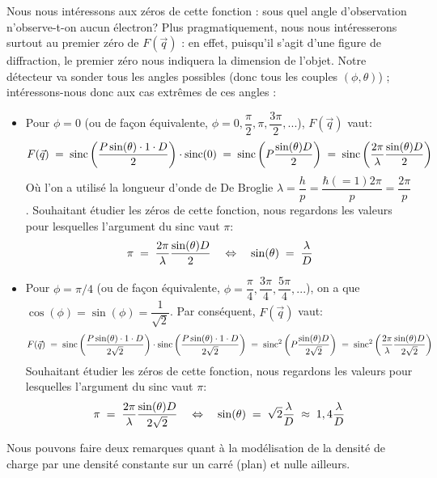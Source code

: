 Nous nous intéressons aux zéros de cette fonction : sous quel angle d'observation n'observe-t-on aucun électron? Plus pragmatiquement, nous nous intéresserons surtout au premier zéro de $F(\vec{q})$ : en effet, puisqu'il s'agit d'une figure de diffraction, le premier zéro nous indiquera la dimension de l'objet. Notre détecteur va sonder tous les angles possibles (donc tous les couples $(\phi,\theta)$) ; intéressons-nous donc aux cas extrêmes de ces angles : 
\begin{itemize}
    
    \item Pour $\phi=0$ (ou de façon équivalente, $\phi=0,\dfrac{\pi}{2},\pi,\dfrac{3\pi}{2},...$), $F(\vec{q})$ vaut:
    \[
        F(\vec{q})  \; = \; \operatorname{sinc}\left(\dfrac{P \sin(\theta)\cdot 1 \cdot D}{2}\right)\cdot \operatorname{sinc}(0) 
        \; = \; \operatorname{sinc}\left(P\dfrac{\sin(\theta)D}{2}\right)
        \; = \; \operatorname{sinc}\left(\dfrac{2\pi}{\lambda}\dfrac{\sin(\theta)D}{2}\right)
    \]
    Où l'on a utilisé la longueur d'onde de De Broglie $\lambda = \dfrac{h}{p} = \dfrac{\hbar(=1) 2\pi}{p} = \dfrac{2\pi}{p}$. Souhaitant étudier les zéros de cette fonction, nous regardons les valeurs pour lesquelles l'argument du sinc vaut $\pi$:
    \[
        \pi 
        \; = \; \dfrac{2\pi}{\lambda}\dfrac{\sin(\theta)D}{2}
        \quad \Leftrightarrow \quad
        \sin(\theta) \; = \; \dfrac{\lambda}{D}
    \]
    
    \item Pour $\phi=\pi/4$ (ou de façon équivalente, $\phi=\dfrac{\pi}{4},\dfrac{3\pi}{4},\dfrac{5\pi}{4},...$), on a que $\cos(\phi)=\sin(\phi)=\dfrac{1}{\sqrt{2}}$. Par conséquent, $F(\vec{q})$ vaut:
    \[
        F(\vec{q})  \; = \; 
        \operatorname{sinc}\left(\dfrac{P \sin(\theta)\cdot 1 \cdot D}{2\sqrt{2}}\right)
        \cdot 
        \operatorname{sinc}\left(\dfrac{P \sin(\theta)\cdot 1 \cdot D}{2\sqrt{2}}\right)
        \; = \; \operatorname{sinc}^2 \left(P \dfrac{\sin(\theta)D}{2\sqrt{2}}\right)
        \; = \; \operatorname{sinc}^2 \left(\dfrac{2\pi}{\lambda}\dfrac{\sin(\theta)D}{2\sqrt{2}}\right)
    \]
    Souhaitant étudier les zéros de cette fonction, nous regardons les valeurs pour lesquelles l'argument du sinc vaut $\pi$:
    \[
        \pi 
        \; = \; \dfrac{2\pi}{\lambda}\dfrac{\sin(\theta)D}{2\sqrt{2}}
        \quad \Leftrightarrow \quad
        \sin(\theta) \; = \; \sqrt{2}\dfrac{\lambda}{D} \;\approx\; 1,4\dfrac{\lambda}{D}
    \]
\end{itemize}
Nous pouvons faire deux remarques quant à la modélisation de la densité de charge par une densité constante sur un carré (plan) et nulle ailleurs.


